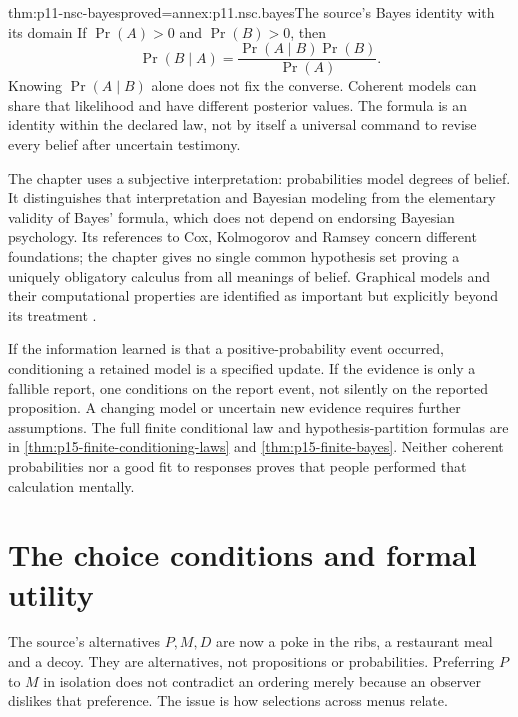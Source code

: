 \begin{hbtheorem}{thm:p11-nsc-bayes}{proved=annex:p11.nsc.bayes}{The source's Bayes identity with its domain}
If \(\Pr(A)>0\) and \(\Pr(B)>0\), then
\[
 \Pr(B\mid A)=\frac{\Pr(A\mid B)\Pr(B)}{\Pr(A)}.
\]
Knowing \(\Pr(A\mid B)\) alone does not fix the converse. Coherent
models can share that likelihood and have different posterior values.
The formula is an identity within the declared law, not by itself a
universal command to revise every belief after uncertain testimony.
\end{hbtheorem}

The chapter uses a subjective interpretation: probabilities model degrees
of belief. It distinguishes that interpretation and Bayesian modeling
from the elementary validity of Bayes' formula, which does not depend
on endorsing Bayesian psychology. Its references to Cox, Kolmogorov and
Ramsey concern different foundations; the chapter gives no single common
hypothesis set proving a uniquely obligatory calculus from all meanings
of belief. Graphical models and their computational properties are
identified as important but explicitly beyond its treatment
\cite[p.~16]{ChaterOaksford2012NormativeSystems}.

If the information learned is that a positive-probability event occurred,
conditioning a retained model is a specified update. If the evidence is
only a fallible report, one conditions on the report event, not silently
on the reported proposition. A changing model or uncertain new evidence
requires further assumptions. The full finite conditional law and
hypothesis-partition formulas are in \ref{thm:p15-finite-conditioning-laws}
and \ref{thm:p15-finite-bayes}. Neither coherent probabilities nor a good
fit to responses proves that people performed that calculation mentally.

\section{The choice conditions and formal utility}
\label{sec:p11-nsc-choice}

The source's alternatives \(P,M,D\) are now a poke in the ribs, a
restaurant meal and a decoy. They are alternatives, not propositions or
probabilities. Preferring \(P\) to \(M\) in isolation does not contradict
an ordering merely because an observer dislikes that preference.
The issue is how selections across menus relate.

